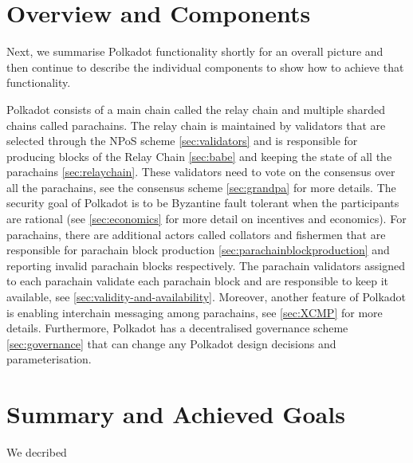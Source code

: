 \section{Overview and Components}\label{sec:components}
Next, we summarise Polkadot functionality shortly for an overall picture and then continue to describe the individual components to show how to achieve that functionality.

Polkadot consists of a main chain called the relay chain and multiple sharded chains called parachains. The relay chain is maintained by validators that are selected through the NPoS scheme \ref{sec:validators} and is responsible for producing blocks of the  Relay Chain \ref{sec:babe} and keeping the state of all the parachains \ref{sec:relaychain}.
These validators need to vote on the consensus over all the parachains, see the consensus scheme \ref{sec:grandpa} for more details.
The security goal of Polkadot is to be Byzantine fault tolerant when the participants are rational (see \ref{sec:economics} for more detail on incentives and economics).
For parachains, there are additional actors called collators and fishermen that are responsible for parachain block production \ref{sec:parachainblockproduction} and reporting invalid parachain blocks respectively.
The parachain validators assigned to each parachain validate each parachain block and are responsible to keep it available, see \ref{sec:validity-and-availability}. Moreover, another feature of Polkadot is enabling interchain messaging among parachains, see \ref{sec:XCMP} for more details.
Furthermore, Polkadot has a decentralised governance scheme \ref{sec:governance} that can change any Polkadot design decisions and parameterisation.










\section{Summary and Achieved Goals}

We decribed 